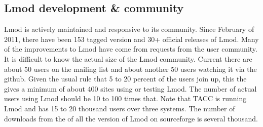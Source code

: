 \subsection{Lmod development \& community}

Lmod is actively maintained and responsive to its community.  Since
February of 2011, there have been 153 tagged version and 30+ official
releases of Lmod.  Many of the improvements to Lmod have come from
requests from the user community.  It is difficult to know the actual
size of the Lmod community.  Current there are about 50 users on the
mailing list and about another 50 users watching it via the github.  
Given the usual rule that 5 to 20 percent of the users join up, this
the gives a minimum of about 400 sites using or testing Lmod.  The
number of actual users using Lmod should be 10 to 100 times that.
Note that TACC is running Lmod and has 15 to 20 thousand users over
three systems.  The number of downloads from the of all the version of
Lmod on sourceforge is several thousand.

%
